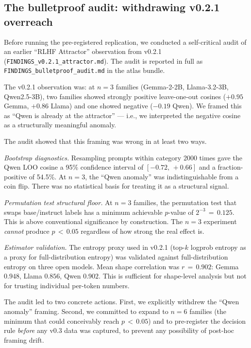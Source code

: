 \documentclass[11pt,letterpaper]{article}
\begin{document}
\subsection{The bulletproof audit: withdrawing v0.2.1 overreach}

Before running the pre-registered replication, we conducted a self-critical
audit of an earlier ``RLHF Attractor'' observation from v0.2.1
(\texttt{FINDINGS\_v0.2.1\_attractor.md}). The audit is reported in full
as \texttt{FINDINGS\_bulletproof\_audit.md} in the atlas bundle.

The v0.2.1 observation was: at $n\!=\!3$ families (Gemma-2-2B, Llama-3.2-3B,
Qwen2.5-3B), two families showed strongly positive leave-one-out cosines
($+0.95$ Gemma, $+0.86$ Llama) and one showed negative ($-0.19$ Qwen). We
framed this as ``Qwen is already at the attractor'' --- i.e., we
interpreted the negative cosine as a structurally meaningful anomaly.

The audit showed that this framing was wrong in at least two ways.

\textit{Bootstrap diagnostics.} Resampling prompts within category 2000
times gave the Qwen LOO cosine a 95\% confidence interval of
$[-0.72,\,+0.66]$ and a fraction-positive of 54.5\%. At $n\!=\!3$, the
``Qwen anomaly'' was indistinguishable from a coin flip. There was no
statistical basis for treating it as a structural signal.

\textit{Permutation test structural floor.} At $n\!=\!3$ families, the
permutation test that swaps base/instruct labels has a minimum achievable
$p$-value of $2^{-3}\,=\,0.125$. This is above conventional significance
by construction. The $n\!=\!3$ experiment \emph{cannot} produce $p\,<\,0.05$
regardless of how strong the real effect is.

\textit{Estimator validation.} The entropy proxy used in v0.2.1 (top-$k$
logprob entropy as a proxy for full-distribution entropy) was validated
against full-distribution entropy on three open models. Mean shape
correlation was $r\,=\,0.902$: Gemma $0.948$, Llama $0.856$, Qwen $0.902$.
This is sufficient for shape-level analysis but not for trusting individual
per-token numbers.

The audit led to two concrete actions. First, we explicitly withdrew the
``Qwen anomaly'' framing. Second, we committed to expand to $n\!=\!6$
families (the minimum that could conceivably reach $p\,<\,0.05$) and to
pre-register the decision rule \emph{before} any v0.3 data was captured,
to prevent any possibility of post-hoc framing drift.
\end{document}
